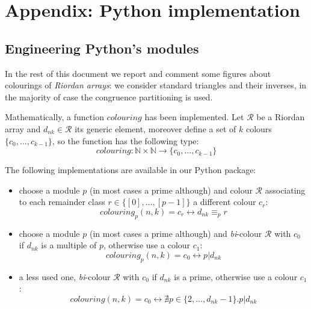 \chapter{Appendix: Python implementation}

\section{Engineering Python's modules}

In the rest of this document we report and comment some figures about
colourings of \emph{Riordan arrays}: we consider standard triangles and their
inverses, in the majority of case the congruence partitioning is used.

Mathematically, a function $colouring$ has been implemented. Let $\mathcal{R}$
be a Riordan array and $d_{nk} \in \mathcal{R}$ its generic element, moreover
define a set of $k$ colours $\lbrace c_0, \ldots, c_{k-1} \rbrace$, so the
function has the following type: 
\begin{displaymath} 
    colouring : \mathbb{N} \times\mathbb{N} \rightarrow \lbrace c_0, \ldots, c_{k-1} \rbrace
\end{displaymath}

The following implementations are available in our Python package:
\begin{itemize}
    \item choose a module $p$ (in most cases a prime although) and
        colour $\mathcal{R}$ associating to each remainder class 
        $r \in \lbrace[0],\ldots,[p-1]\rbrace$
        a different colour $c_r$:
        \begin{displaymath}
            colouring_{p}(n,k) = c_{r} \leftrightarrow d_{nk} \equiv_{p} r
        \end{displaymath}
    \item choose a module $p$ (in most cases a prime although) and
        \emph{bi}-colour $\mathcal{R}$ with $c_0$ if $d_{nk}$ 
        is a multiple of $p$, otherwise use a colour $c_1$:
        \begin{displaymath}
            colouring_{p}(n,k) = c_{0} \leftrightarrow p | d_{nk}
        \end{displaymath}
    \item a less used one, \emph{bi}-colour $\mathcal{R}$ with $c_0$ 
        if $d_{nk}$ is a prime, otherwise use a colour $c_1$:
        \begin{displaymath}
            colouring(n,k) = c_{0} \leftrightarrow 
                \nexists p\in\lbrace 2,\ldots,d_{nk}-1\rbrace.p|d_{nk} 
        \end{displaymath}
\end{itemize}

